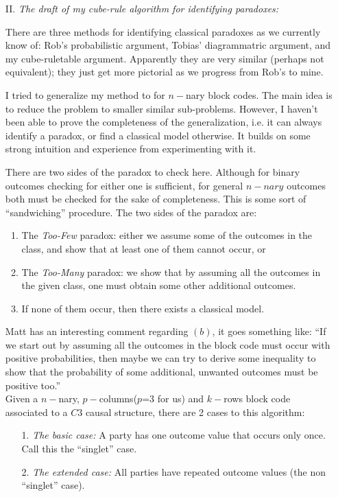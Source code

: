 \documentclass[12pt]{article}  %
\begin{document}
\begin{enumerate}
\


\item[II.] \textit{The draft of my cube-rule algorithm for identifying paradoxes:} 

There are three methods for identifying classical paradoxes as we currently know of: Rob's probabilistic argument, Tobias' diagrammatric argument, and my cube-ruletable argument. Apparently they are very similar (perhaps not equivalent); they just get more pictorial as we progress from Rob's to mine.

I tried to generalize my method to for $n-$nary block codes. The main idea is to reduce the problem to smaller similar sub-problems. However, I haven't been able to prove the completeness of the generalization, i.e. it can always identify a paradox, or find a classical model otherwise. It builds on some strong intuition and experience from experimenting with it. 


There are two sides of the paradox to check here. Although for binary outcomes checking for either one is sufficient, for general $n-nary$ outcomes both must be checked for the sake of completeness. This is some sort of ``sandwiching'' procedure. The two sides of the paradox are:

\begin{enumerate}
\item The \textit{Too-Few} paradox: either we assume some of the outcomes in the class, and show that at least one of them cannot occur, or
\item The \textit{Too-Many} paradox: we show that by assuming all the outcomes in the given class, one must obtain some other additional outcomes.
\item If none of them occur, then there exists a classical model.
\end{enumerate}

Matt has an interesting comment regarding $(b)$, it goes something like: ``If we start out by assuming all the outcomes in the block code must occur with positive probabilities, then maybe we can try to derive some inequality to show that the probability of some additional, unwanted outcomes must be positive too.''\\


Given a $n-$nary, $p-$columns($p$=3 for us) and $k-$rows block code associated to a $C3$ causal structure, there are 2 cases to this algorithm: 


\begin{enumerate}
\item[1.] \textit{The basic case:} A party has one outcome value that occurs only once. Call this the ``singlet'' case.
\item[2.] \textit{The extended case:} All parties have repeated outcome values (the non ``singlet'' case).
\end{enumerate}



\end{enumerate}
\end{document}
